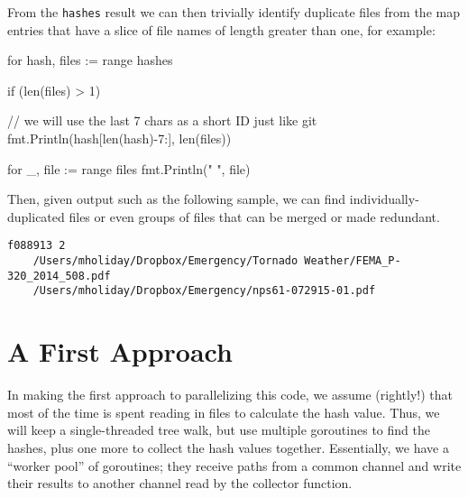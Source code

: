 \documentclass[12pt,notitlepage]{article}
\begin{document}
From the \verb|hashes| result we can then trivially identify duplicate files
from the map entries that have a slice of file names of length greater than one,
for example:
\begin{golang}
	for hash, files := range hashes {
		if (len(files) > 1) {
            // we will use the last 7 chars as a short ID just like git
			fmt.Println(hash[len(hash)-7:], len(files))

			for _, file := range files {
				fmt.Println("   ", file)
			}
		}
	}
\end{golang}
Then, given output such as the following sample, we can find individually-duplicated
files or even groups of files that can be merged or made redundant.
\vspace{-0.4\baselineskip}
\begin{Verbatim}
f088913 2
    /Users/mholiday/Dropbox/Emergency/Tornado Weather/FEMA_P-320_2014_508.pdf
    /Users/mholiday/Dropbox/Emergency/nps61-072915-01.pdf
\end{Verbatim}

\section{A First Approach}
In making the first approach to parallelizing this code, we assume (rightly!) that
most of the time is spent reading in files to calculate the hash value. Thus,
we will keep a single-threaded tree walk, but use multiple goroutines to find
the hashes, plus one more to collect the hash values together. Essentially, we
have a ``worker pool'' of goroutines; they receive paths from a common channel
and write their results to another channel read by the collector function.
\end{document}
